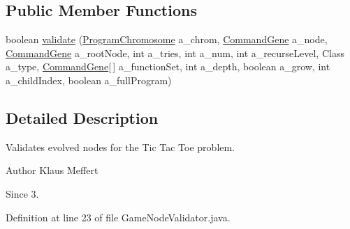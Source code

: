 \subsection*{Public Member Functions}
\begin{DoxyCompactItemize}
\item 
boolean \hyperlink{classexamples_1_1gp_1_1tictactoe_1_1_game_node_validator_a02996b5a9558c698b5a9b8a1f68bc86a}{validate} (\hyperlink{classorg_1_1jgap_1_1gp_1_1impl_1_1_program_chromosome}{Program\-Chromosome} a\-\_\-chrom, \hyperlink{classorg_1_1jgap_1_1gp_1_1_command_gene}{Command\-Gene} a\-\_\-node, \hyperlink{classorg_1_1jgap_1_1gp_1_1_command_gene}{Command\-Gene} a\-\_\-root\-Node, int a\-\_\-tries, int a\-\_\-num, int a\-\_\-recurse\-Level, Class a\-\_\-type, \hyperlink{classorg_1_1jgap_1_1gp_1_1_command_gene}{Command\-Gene}\mbox{[}$\,$\mbox{]} a\-\_\-function\-Set, int a\-\_\-depth, boolean a\-\_\-grow, int a\-\_\-child\-Index, boolean a\-\_\-full\-Program)
\end{DoxyCompactItemize}


\subsection{Detailed Description}
Validates evolved nodes for the Tic Tac Toe problem.

\begin{DoxyAuthor}{Author}
Klaus Meffert 
\end{DoxyAuthor}
\begin{DoxySince}{Since}
3. 
\end{DoxySince}


Definition at line 23 of file Game\-Node\-Validator.\-java.



